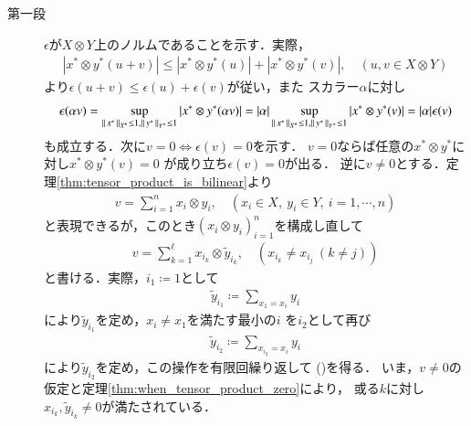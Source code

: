 	\begin{prf}\mbox{}
		\begin{description}
			\item[第一段]
				$\epsilon$が$X \otimes Y$上のノルムであることを示す．実際，
				\begin{align}
					\left| x^* \otimes y^* (u+v) \right|
					\leq \left| x^* \otimes y^* (u) \right|
					+ \left| x^* \otimes y^* (v) \right|,
					\quad (u,v \in X \otimes Y)
				\end{align}
				より$\epsilon(u + v) \leq \epsilon(u) + \epsilon(v)$が従い，また
				スカラー$\alpha$に対し
				\begin{align}
					\epsilon(\alpha v)
					= \operatorname*{sup}_{\left\|\, x^*\, \right\|_{X^*}\leq 1,\left\|\, y^*\, \right\|_{Y^*} \leq 1} \left| x^* \otimes y^* (\alpha v) \right|
					= |\alpha| \operatorname*{sup}_{\left\|\, x^*\, \right\|_{X^*}\leq 1,\left\|\, y^*\, \right\|_{Y^*} \leq 1} \left| x^* \otimes y^* (v) \right|
					= |\alpha| \epsilon(v)
				\end{align}
				も成立する．次に$v = 0 \Leftrightarrow \epsilon(v) = 0$を示す．
				$v = 0$ならば任意の$x^* \otimes y^*$に対し$x^* \otimes y^* (v) = 0$
				が成り立ち$\epsilon(v) = 0$が出る．
				逆に$v \neq 0$とする．定理\ref{thm:tensor_product_is_bilinear}より
				\begin{align}
					v = \sum_{i=1}^{n} x_i \otimes y_i,
					\quad (x_i \in X,\ y_i \in Y,\  i=1,\cdots,n)
				\end{align}
				と表現できるが，このとき$(x_i \otimes y_i)_{i=1}^{n}$を構成し直して
				\begin{align}
					v = \sum_{k=1}^{\ell} x_{i_k} \otimes \tilde{y}_{i_k},
					\quad (x_{i_k} \neq x_{i_j}\ (k \neq j))
					\label{eq:thm_injective_norm_is_the_minimum_cross_norm_1}
				\end{align}
				と書ける．実際，$i_1 \coloneqq 1$として
				\begin{align}
					\tilde{y}_{i_1} \coloneqq \sum_{x_1 = x_i} y_i
				\end{align}
				により$\tilde{y}_{i_1}$を定め，$x_i \neq x_1$を満たす最小の$i$
				を$i_2$として再び
				\begin{align}
					\tilde{y}_{i_2} \coloneqq \sum_{x_{i_2} = x_i} y_i
				\end{align}
				により$\tilde{y}_{i_2}$を定め，この操作を有限回繰り返して
				()を得る．
				いま，$v \neq 0$の仮定と定理\ref{thm:when_tensor_product_zero}により，
				或る$k$に対し$x_{i_k}, \tilde{y}_{i_k} \neq 0$が満たされている．
				\begin{align}

\end{align}
\end{description}
\end{prf}
